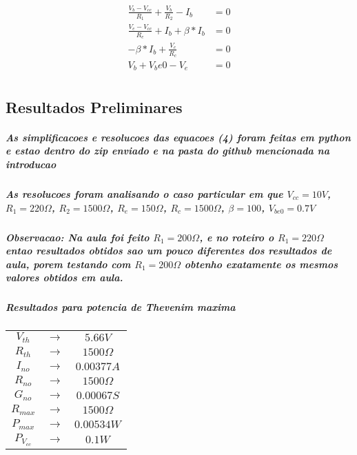\documentclass[12pt,twoside, a4paper, twocolumn]{article}
\begin{document}
\begin{equation}
    \begin{aligned}
        \frac{V_b - V_{cc}}{R_1} + \frac{V_b}{R_2} - I_b & = 0 \\
        \frac{V_e - V_{cc}}{R_e} + I_b + \beta*I_b       & = 0 \\
        -\beta*I_b + \frac{V_c}{R_c}                     & = 0 \\
        V_b + {V_be0} - V_e                              & = 0 \\
    \end{aligned}
\end{equation}

\subsection{Resultados Preliminares}

\subparagraph*{As simplificacoes e resolucoes das equacoes (4) foram feitas em python e estao dentro do zip enviado e na pasta do github mencionada na introducao}

\subparagraph*{As resolucoes foram analisando o caso particular em que $V_{cc} = 10V$, $R_1 = 220 \varOmega$, $R_2 = 1500 \varOmega$, $R_e = 150\varOmega$, $R_c = 1500\varOmega$, $\beta = 100$, $V_{be0} = 0.7V$}

\subparagraph*{Observacao: Na aula foi feito $R_1 = 200 \varOmega$, e no roteiro o $R_1 = 220 \varOmega$ entao resultados obtidos sao um pouco diferentes dos resultados de aula, porem testando com $R_1 = 200 \varOmega$ obtenho exatamente os mesmos valores obtidos em aula.}


\subparagraph*{Resultados para potencia de Thevenim maxima}

\begin{center}
    \begin{tabular}{ |ccc| }
        \hline
        $V_{th}$     & $\rightarrow$ & $5.66V$          \\
        $R_{th}$     & $\rightarrow$ & $1500 \varOmega$ \\
        $I_{no}$     & $\rightarrow$ & $0.00377 A$      \\
        $R_{no}$     & $\rightarrow$ & $1500 \varOmega$ \\
        $G_{no}$     & $\rightarrow$ & $0.00067 S$      \\
        $R_{max}$    & $\rightarrow$ & $1500 \varOmega$ \\
        $P_{max}$    & $\rightarrow$ & $0.00534W$       \\
        $P_{V_{cc}}$ & $\rightarrow$ & $0.1W$           \\

        \hline
    \end{tabular}
\end{center}


\end{document}
